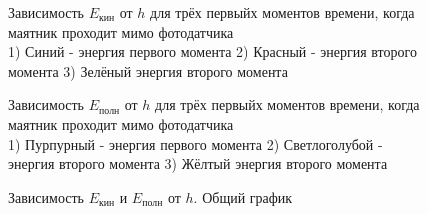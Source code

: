 \documentclass[a4paper]{article}
\begin{document}
\begin{figure}[h!]
    
    \caption{Зависимость $E_{кин}$ от $h$  для трёх первыйх моментов времени, когда маятник проходит мимо фотодатчика\\ 1) Синий - энергия первого момента 2) Красный - энергия второго момента 3) Зелёный энергия второго момента}
    \label{E_kin}
\end{figure}

\begin{figure}[h!]
    
    \caption{Зависимость $E_{полн}$ от $h$ для трёх первыйх моментов времени, когда маятник проходит мимо фотодатчика\\ 1) Пурпурный - энергия первого момента 2) Светлоголубой - энергия второго момента 3) Жёлтый энергия второго момента}
    \label{E_full}
\end{figure}

\begin{figure}[h!]
    
    \caption{Зависимость $E_{кин}$ и $E_{полн}$ от $h$. Общий график}
    \label{plotEfull}
\end{figure}

%     

%     

%     
\end{document}

